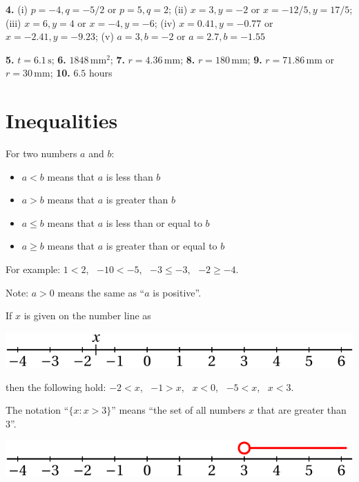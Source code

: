 \documentclass[
  12pt,
  oneside]{book}
\providecommand{\tightlist}{%
  \setlength{\itemsep}{0pt}\setlength{\parskip}{0pt}}
\theoremstyle{definition}
\theoremstyle{definition}
\theoremstyle{definition}
\theoremstyle{definition}
\theoremstyle{remark}
\begin{document}
\textbf{4.} (i) \(p=-4,q=-5/2\) or \(p=5,q=2\); (ii) \(x=3,y=-2\) or \(x=-12/5,y=17/5\); (iii) \(x=6,y=4\) or \(x=-4,y=-6\); (iv) \(x=0.41,y=-0.77\) or \(x=-2.41,y=-9.23\); (v) \(a=3,b=-2\) or \(a=2.7,b=-1.55\)

\textbf{5.} \(t=6.1\,\mathrm{s}\); \textbf{6.} \(1848\,\mathrm{mm}^2\); \textbf{7.} \(r=4.36\,\mathrm{mm}\); \textbf{8.} \(r=180\,\mathrm{mm}\); \textbf{9.} \(r=71.86\,\mathrm{mm}\) or \(r=30\,\mathrm{mm}\); \textbf{10.} \(6.5\) hours

\chapter{Inequalities}\label{inequalities}

For two numbers \(a\) and \(b\):

\begin{itemize}
\tightlist
\item
  \(a<b\) means that \(a\) is less than \(b\)
\item
  \(a>b\) means that \(a\) is greater than \(b\)
\item
  \(a\leq b\) means that \(a\) is less than or equal to \(b\)
\item
  \(a\geq b\) means that \(a\) is greater than or equal to \(b\)
\end{itemize}

For example: \(1<2\),~ \(-10<-5\),~ \(-3\leq -3\),~ \(-2\geq -4\).

Note: \(a>0\) means the same as ``\(a\) is positive''.

If \(x\) is given on the number line as

\begin{center}\includegraphics{t04-numline1} \end{center}

then the following hold: \(-2<x\),~ \(-1>x\),~ \(x<0\),~ \(-5<x\),~ \(x<3\).

The notation ``\(\{x : x>3\}\)'' means ``the set of all numbers \(x\) that are greater than \(3\)''.

\begin{center}\includegraphics{t04-numline2} \end{center}
\end{document}
